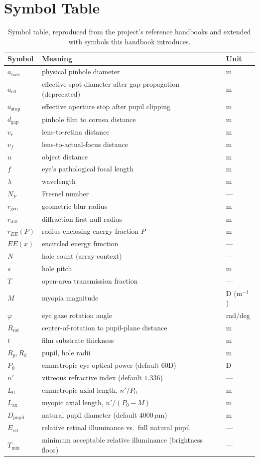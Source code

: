 \documentclass[11pt]{report}
\newcommand{\ahole}{a_{\text{hole}}}
\newcommand{\aeff}{a_{\text{eff}}}
\newcommand{\astop}{a_{\text{stop}}}
\newcommand{\dgap}{d_{\text{gap}}}
\newcommand{\vr}{v_r}
\newcommand{\vf}{v_f}
\newcommand{\rgeo}{r_{\text{geo}}}
\newcommand{\rdiff}{r_{\text{diff}}}
\newcommand{\Dpupil}{D_{\text{pupil}}}
\newcommand{\Erel}{E_{\text{rel}}}
\newcommand{\Tmin}{T_{\min}}
\begin{document}
\chapter{Symbol Table}
\label{app:symbols}
\begin{longtable}{p{2.3cm}p{8cm}p{2cm}}
\caption{Symbol table, reproduced from the project's reference handbooks and extended with symbols this handbook introduces.}\\
\toprule
\textbf{Symbol} & \textbf{Meaning} & \textbf{Unit} \\
\midrule
\endhead
$\ahole$ & physical pinhole diameter & m \\
$\aeff$ & effective spot diameter after gap propagation (deprecated) & m \\
$\astop$ & effective aperture stop after pupil clipping & m \\
$\dgap$ & pinhole film to cornea distance & m \\
$\vr$ & lens-to-retina distance & m \\
$\vf$ & lens-to-actual-focus distance & m \\
$u$ & object distance & m \\
$f$ & eye's pathological focal length & m \\
$\lambda$ & wavelength & m \\
$N_F$ & Fresnel number & --- \\
$\rgeo$ & geometric blur radius & m \\
$\rdiff$ & diffraction first-null radius & m \\
$r_{EE}(P)$ & radius enclosing energy fraction $P$ & m \\
$EE(x)$ & encircled energy function & --- \\
$N$ & hole count (array context) & --- \\
$s$ & hole pitch & m \\
$T$ & open-area transmission fraction & --- \\
$M$ & myopia magnitude & D (m$^{-1}$) \\
$\varphi$ & eye gaze rotation angle & rad/deg \\
$R_{\text{rot}}$ & center-of-rotation to pupil-plane distance & m \\
$t$ & film substrate thickness & m \\
$R_p, R_h$ & pupil, hole radii & m \\
$P_0$ & emmetropic eye optical power (default $60$D) & D \\
$n'$ & vitreous refractive index (default $1.336$) & --- \\
$L_0$ & emmetropic axial length, $n'/P_0$ & m \\
$L_{\text{ax}}$ & myopic axial length, $n'/(P_0-M)$ & m \\
$\Dpupil$ & natural pupil diameter (default $4000\,\mu$m) & m \\
$\Erel$ & relative retinal illuminance vs.\ full natural pupil & --- \\
$\Tmin$ & minimum acceptable relative illuminance (brightness floor) & --- \\
\bottomrule
\end{longtable}
\end{document}
